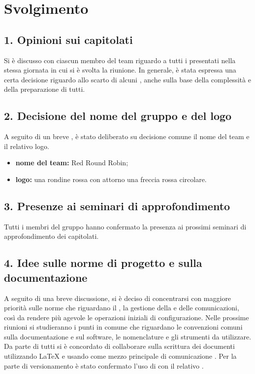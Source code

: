 \newpage
\section*{Svolgimento}

\subsection*{1. Opinioni sui capitolati}

Si è discusso con ciascun membro del team riguardo a tutti i  presentati nella stessa giornata in cui si è svolta la riunione.
\newline
In generale, è stata espressa una certa decisione riguardo allo scarto di alcuni , anche sulla base della complessità e della preparazione di tutti.

\subsection*{2. Decisione del nome del gruppo e del logo}

A seguito di un breve , è stato deliberato su decisione comune il nome del team e il relativo logo.

\begin{itemize}
	\item \textbf{nome del team:} Red Round Robin;
	\item \textbf{logo:} una rondine rossa con attorno una freccia rossa circolare.
\end{itemize}

\subsection*{3. Presenze ai seminari di approfondimento}

Tutti i membri del gruppo hanno confermato la presenza ai prossimi seminari di approfondimento dei capitolati.

\subsection*{4. Idee sulle norme di progetto e sulla documentazione}


A seguito di una breve discussione, si è deciso di concentrarsi con maggiore priorità sulle norme che riguardano il , la gestione della  e delle comunicazioni, così da rendere più agevole le operazioni iniziali di configurazione.
Nelle prossime riunioni si studieranno i punti in comune che riguardano le convenzioni comuni sulla documentazione e sul software, le nomenclature e gli strumenti da utilizzare.
\newline
Da parte di tutti si è concordato di collaborare sulla scrittura dei documenti utilizzando \LaTeX{} e usando come mezzo principale di comunicazione . Per la parte di versionamento è stato confermato l'uso di  con il relativo .

